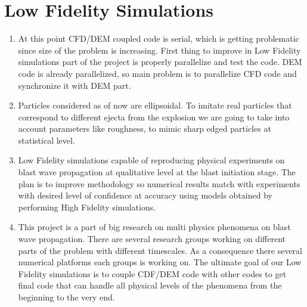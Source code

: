 \section{Low Fidelity Simulations}
\begin{enumerate}[1.]

\item
{} At this point CFD/DEM coupled code is serial, which is getting problematic since size of the problem is increasing. First thing to improve in Low Fidelity simulations part of the project is properly parallelize and test the code. DEM code is already parallelized, so main problem is to parallelize CFD code and synchronize it with DEM part.

\item
{} Particles considered as of now are ellipsoidal. To imitate real particles that correspond to different ejecta from the explosion we are going to take into account parameters like roughness, to mimic sharp edged particles at statistical level.

\item
{} Low Fidelity simulations capable of reproducing physical experiments on blast wave propagation at qualitative level at the blast initiation stage. The plan is to improve methodology so numerical results match with experiments with desired level of confidence at accuracy using models obtained by performing High Fidelity simulations.

\item
{} This project is a part of big research on multi physics phenomena on blast wave propagation. There are several research groups working on different parts of the problem with different timescales. As a consequence there several numerical platforms each groups is working on. The ultimate goal of our Low Fidelity simulations is to couple CDF/DEM code with other codes to get final code that can handle all physical levels of the phenomena from the beginning to the very end.

\end{enumerate}
